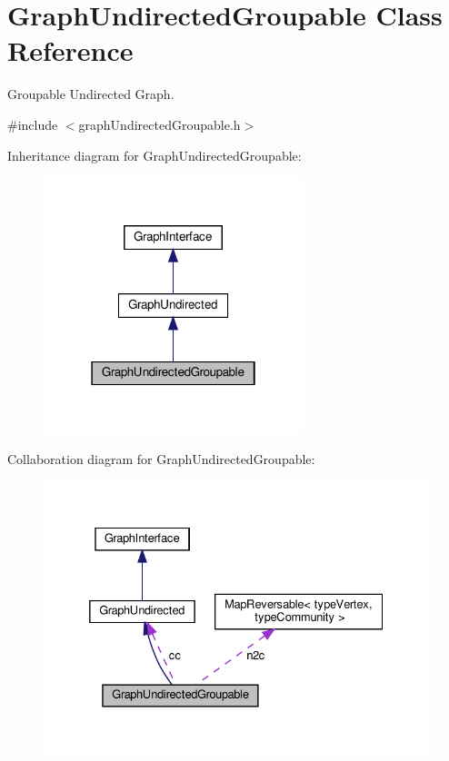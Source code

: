 \hypertarget{classGraphUndirectedGroupable}{}\section{Graph\+Undirected\+Groupable Class Reference}
\label{classGraphUndirectedGroupable}


Groupable Undirected Graph.  




{\ttfamily \#include $<$graph\+Undirected\+Groupable.\+h$>$}



Inheritance diagram for Graph\+Undirected\+Groupable\+:
\nopagebreak
\begin{figure}[H]
\begin{center}
\leavevmode
\includegraphics[width=214pt]{classGraphUndirectedGroupable__inherit__graph}
\end{center}
\end{figure}


Collaboration diagram for Graph\+Undirected\+Groupable\+:
\nopagebreak
\begin{figure}[H]
\begin{center}
\leavevmode
\includegraphics[width=332pt]{classGraphUndirectedGroupable__coll__graph}
\end{center}
\end{figure}
